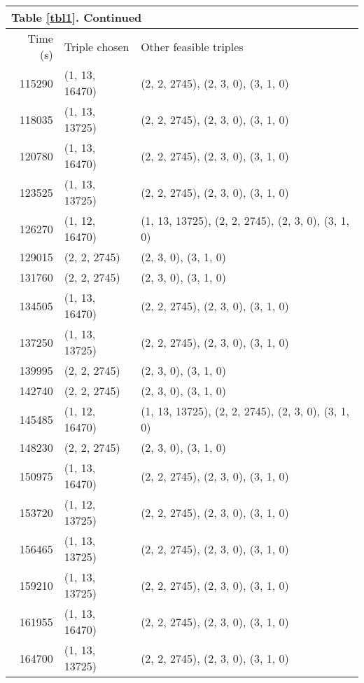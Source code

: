 \begin{table}[h!t!]
\begin{tabular}{r l l}
\multicolumn{3}{l}{Table \ref{tbl1}. Continued}\\%
\hline {{Time (s)}} & {{Triple chosen}} & {{Other feasible triples}} \\ \hline
115290 & (1, 13, 16470) & (2, 2, 2745), (2, 3, 0), (3, 1, 0) \\
118035 & (1, 13, 13725) & (2, 2, 2745), (2, 3, 0), (3, 1, 0) \\
120780 & (1, 13, 16470) & (2, 2, 2745), (2, 3, 0), (3, 1, 0) \\
123525 & (1, 13, 13725) & (2, 2, 2745), (2, 3, 0), (3, 1, 0) \\
126270 & (1, 12, 16470) & (1, 13, 13725), (2, 2, 2745), (2, 3, 0), (3, 1, 0) \\
129015 & (2, 2, 2745) & (2, 3, 0), (3, 1, 0) \\
131760 & (2, 2, 2745) & (2, 3, 0), (3, 1, 0) \\
134505 & (1, 13, 16470) & (2, 2, 2745), (2, 3, 0), (3, 1, 0) \\
137250 & (1, 13, 13725) & (2, 2, 2745), (2, 3, 0), (3, 1, 0) \\
139995 & (2, 2, 2745) & (2, 3, 0), (3, 1, 0) \\
142740 & (2, 2, 2745) & (2, 3, 0), (3, 1, 0) \\
145485 & (1, 12, 16470) & (1, 13, 13725), (2, 2, 2745), (2, 3, 0), (3, 1, 0)\\%
148230 & (2, 2, 2745) & (2, 3, 0), (3, 1, 0) \\
150975 & (1, 13, 16470) & (2, 2, 2745), (2, 3, 0), (3, 1, 0) \\
153720 & (1, 12, 13725) & (2, 2, 2745), (2, 3, 0), (3, 1, 0) \\
156465 & (1, 13, 13725) & (2, 2, 2745), (2, 3, 0), (3, 1, 0) \\
159210 & (1, 13, 13725) & (2, 2, 2745), (2, 3, 0), (3, 1, 0) \\
161955 & (1, 13, 16470) & (2, 2, 2745), (2, 3, 0), (3, 1, 0) \\
164700 & (1, 13, 13725) & (2, 2, 2745), (2, 3, 0), (3, 1, 0) \\
\hline
\end{tabular}
\end{table}


